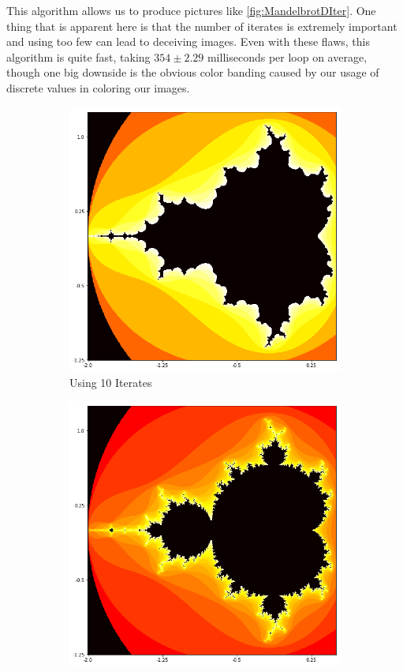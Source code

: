 \documentclass{amsart}
\theoremstyle{definition}
\theoremstyle{remark}
\numberwithin{equation}{section}
\begin{document}
\inputminted[mathescape]{python}{code-snippets/Mandelbrot_d.py}

This algorithm allows us to produce pictures like \cref{fig:MandelbrotDIter}. One thing that is apparent here is that the number of iterates is extremely important and using too few can lead to deceiving images. Even with these flaws, this algorithm is quite fast, taking $354 \pm 2.29$ milliseconds per loop on average, though one big downside is the obvious color banding caused by our usage of discrete values in coloring our images.

\begin{figure}[h]
\centering
\begin{subfigure}{.33\textwidth}
  \centering
  \includegraphics[width=0.9\linewidth]{Mandelbrot_d_10.png}
  \caption{Using 10 Iterates}
\end{subfigure}%
\begin{subfigure}{.33\textwidth}
  \centering
  \includegraphics[width=0.9\linewidth]{Mandelbrot_d_30.png}

\end{subfigure}
\end{figure}
\end{document}

